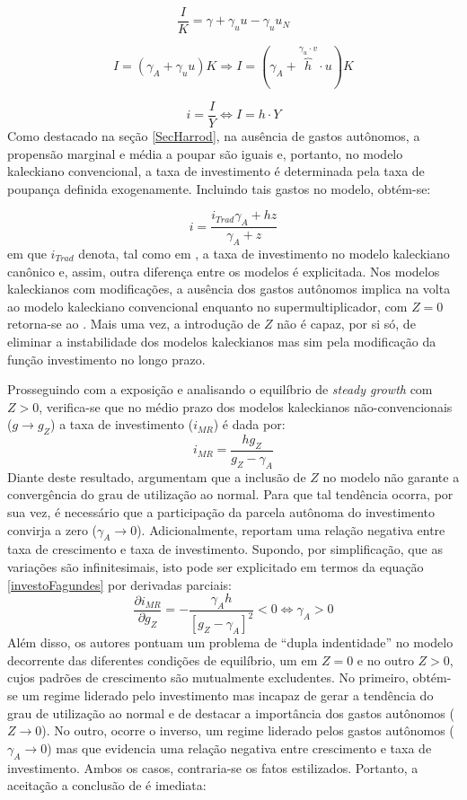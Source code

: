 $$
\frac{I}{K}  = \gamma + \gamma_uu - \gamma_uu_N
$$


\begin{equation}
\tag{kaleckiana}
I = (\gamma_A + \gamma_uu)K \Rightarrow I = (\gamma_A + \overbrace{h}^{\gamma_u\cdot v}\cdot u)K
\end{equation}

\begin{equation}
\tag{SSM}
i = \frac{I}{Y} \Leftrightarrow I = h\cdot Y
\end{equation}
Como destacado na seção \ref{SecHarrod}, na ausência de gastos autônomos, a propensão marginal e média a poupar são iguais e, portanto, no modelo kaleckiano convencional, a taxa de investimento é determinada pela taxa de poupança definida exogenamente. Incluindo tais gastos no modelo, obtém-se:

$$
i = \frac{i_{Trad}\gamma_A + hz}{\gamma_A + z}
$$
em que $i_{Trad}$ denota, tal como em \textcite{fagundes_dinamica_2017}, a taxa de investimento no modelo kaleckiano canônico e, assim, outra diferença entre os modelos é explicitada. Nos modelos kaleckianos com modificações, a ausência dos gastos autônomos implica na volta ao modelo kaleckiano convencional enquanto no supermultiplicador, com $Z = 0$ retorna-se ao \textcite{harrod_essay_1939}. Mais uma vez, a introdução de $Z$ não é capaz, por si só, de eliminar a instabilidade dos modelos kaleckianos mas sim pela modificação da função investimento no longo prazo. 

Prosseguindo com a exposição e analisando o equilíbrio de \textit{steady growth} com $Z > 0$, verifica-se que no médio prazo dos modelos kaleckianos não-convencionais ($g\to g_Z$) a taxa de investimento ($i_{MR}$) é dada por:
\begin{equation}
\label{investoFagundes}
i_{MR} = \frac{hg_Z}{g_Z - \gamma_A}
\end{equation}
Diante deste resultado, \textcite{fagundes_role_2017} argumentam que a inclusão de $Z$ no modelo não garante a convergência do grau de utilização ao normal. Para que tal tendência ocorra, por sua vez, é necessário que a participação da parcela autônoma do investimento convirja a zero ($\gamma_A \to 0$). 
Adicionalmente, \textcite{fagundes_role_2017} reportam uma relação negativa entre taxa de crescimento e taxa de investimento. Supondo, por simplificação, que as variações são infinitesimais, isto pode ser explicitado em termos da equação \ref{investoFagundes} por derivadas parciais:
$$
\frac{\partial i_{MR}}{\partial g_Z} = - \frac{\gamma_A h}{[g_Z - \gamma_A]^2} < 0 \Leftrightarrow \gamma_A > 0
$$
Além disso, os autores pontuam um problema de ``dupla indentidade'' no modelo decorrente das diferentes condições de equilíbrio, um em $Z = 0$ e no outro $Z>0$, cujos padrões de crescimento são mutualmente excludentes. No primeiro, obtém-se um regime liderado pelo investimento mas incapaz de gerar a tendência do grau de utilização ao normal e de destacar a importância dos gastos autônomos ($Z\to 0$). No outro, ocorre o inverso, um regime liderado pelos gastos autônomos ($\gamma_A \to 0$) mas que evidencia uma relação negativa entre crescimento e taxa de investimento. Ambos os casos, contraria-se os fatos estilizados. Portanto, a aceitação a conclusão de \textcite[p.~13]{fagundes_role_2017} é imediata:

